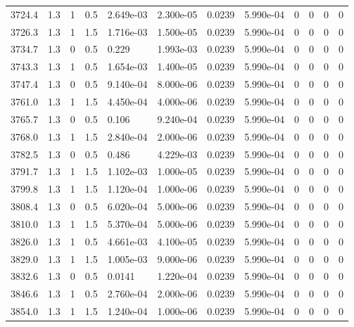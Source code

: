 \documentclass[preview]{standalone}
\begin{document}
{{{{{{{{{{{{{{{\begin{tabular}{L{1.2cm}C{1.2cm} C{0.3cm}C{0.5cm} C{1.4cm}C{1.4cm} C{1.4cm}C{1.4cm} C{1.6cm}C{1.6cm} C{1.6cm}C{1.6cm}}
  3724.4  &   1.3  & 1     & 0.5 &  2.649e-03  & 2.300e-05  &  0.0239&   5.990e-04& 0 & 0   &  0 & 0  \\ 
  3726.3  &   1.3  & 1     & 1.5 &  1.716e-03  & 1.500e-05  &  0.0239&   5.990e-04& 0 & 0   &  0 & 0  \\ 
  3734.7  &   1.3  & 0     & 0.5 &  0.229  & 1.993e-03  &  0.0239&   5.990e-04& 0 & 0   &  0 & 0  \\ 
  3743.3  &   1.3  & 1     & 0.5 &  1.654e-03  & 1.400e-05  &  0.0239&   5.990e-04& 0 & 0   &  0 & 0  \\ 
  3747.4  &   1.3  & 0     & 0.5 &  9.140e-04  & 8.000e-06  &  0.0239&   5.990e-04& 0 & 0   &  0 & 0  \\ 
  3761.0  &   1.3  & 1     & 1.5 &  4.450e-04  & 4.000e-06  &  0.0239&   5.990e-04& 0 & 0   &  0 & 0  \\ 
  3765.7  &   1.3  & 0     & 0.5 &  0.106  & 9.240e-04  &  0.0239&   5.990e-04& 0 & 0   &  0 & 0  \\ 
  3768.0  &   1.3  & 1     & 1.5 &  2.840e-04  & 2.000e-06  &  0.0239&   5.990e-04& 0 & 0   &  0 & 0  \\ 
  3782.5  &   1.3  & 0     & 0.5 &  0.486  & 4.229e-03  &  0.0239&   5.990e-04& 0 & 0   &  0 & 0  \\ 
  3791.7  &   1.3  & 1     & 1.5 &  1.102e-03  & 1.000e-05  &  0.0239&   5.990e-04& 0 & 0   &  0 & 0  \\ 
  3799.8  &   1.3  & 1     & 1.5 &  1.120e-04  & 1.000e-06  &  0.0239&   5.990e-04& 0 & 0   &  0 & 0  \\ 
  3808.4  &   1.3  & 0     & 0.5 &  6.020e-04  & 5.000e-06  &  0.0239&   5.990e-04& 0 & 0   &  0 & 0  \\ 
  3810.0  &   1.3  & 1     & 1.5 &  5.370e-04  & 5.000e-06  &  0.0239&   5.990e-04& 0 & 0   &  0 & 0  \\ 
  3826.0  &   1.3  & 1     & 0.5 &  4.661e-03  & 4.100e-05  &  0.0239&   5.990e-04& 0 & 0   &  0 & 0  \\ 
  3829.0  &   1.3  & 1     & 1.5 &  1.005e-03  & 9.000e-06  &  0.0239&   5.990e-04& 0 & 0   &  0 & 0  \\ 
  3832.6  &   1.3  & 0     & 0.5 &  0.0141  & 1.220e-04  &  0.0239&   5.990e-04& 0 & 0   &  0 & 0  \\ 
  3846.6  &   1.3  & 1     & 0.5 &  2.760e-04  & 2.000e-06  &  0.0239&   5.990e-04& 0 & 0   &  0 & 0  \\ 
  3854.0  &   1.3  & 1     & 1.5 &  1.240e-04  & 1.000e-06  &  0.0239&   5.990e-04& 0 & 0   &  0 & 0  \\ 

\end{tabular}}}}}}}}}}}}}}}}
\end{document}
